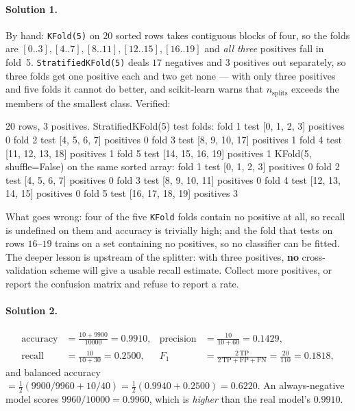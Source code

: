\documentclass[11pt]{article}
\begin{document}
\paragraph{Solution 1.} By hand: \texttt{KFold(5)} on $20$ sorted rows takes
contiguous blocks of four, so the folds are $[0..3], [4..7], [8..11],
[12..15], [16..19]$ and \emph{all three} positives fall in fold~5.
\texttt{StratifiedKFold(5)} deals $17$ negatives and $3$ positives out
separately, so three folds get one positive each and two get none --- with
only three positives and five folds it cannot do better, and scikit-learn
warns that $n_{\text{splits}}$ exceeds the members of the smallest class.
Verified:

\begin{codeout}
20 rows, 3 positives.  StratifiedKFold(5) test folds:
   fold 1  test [0, 1, 2, 3]  positives 0
   fold 2  test [4, 5, 6, 7]  positives 0
   fold 3  test [8, 9, 10, 17]  positives 1
   fold 4  test [11, 12, 13, 18]  positives 1
   fold 5  test [14, 15, 16, 19]  positives 1
KFold(5, shuffle=False) on the same sorted array:
   fold 1  test [0, 1, 2, 3]  positives 0
   fold 2  test [4, 5, 6, 7]  positives 0
   fold 3  test [8, 9, 10, 11]  positives 0
   fold 4  test [12, 13, 14, 15]  positives 0
   fold 5  test [16, 17, 18, 19]  positives 3
\end{codeout}

What goes wrong: four of the five \texttt{KFold} folds contain no positive at
all, so recall is undefined on them and accuracy is trivially high; and the
fold that tests on rows $16$--$19$ trains on a set containing no positives, so
no classifier can be fitted. The deeper lesson is upstream of the splitter:
with three positives, \textbf{no} cross-validation scheme will give a usable
recall estimate. Collect more positives, or report the confusion matrix and
refuse to report a rate.

\paragraph{Solution 2.}
\begin{align*}
  \text{accuracy} &= \frac{10 + 9900}{10000} = 0.9910, &
  \text{precision} &= \frac{10}{10 + 60} = 0.1429,\\
  \text{recall} &= \frac{10}{10 + 30} = 0.2500, &
  F_1 &= \frac{2\,\mathrm{TP}}{2\,\mathrm{TP} + \mathrm{FP} + \mathrm{FN}}
      = \frac{20}{110} = 0.1818,
\end{align*}
and balanced accuracy $= \tfrac12(9900/9960 + 10/40) = \tfrac12(0.9940 +
0.2500) = 0.6220$. An always-negative model scores $9960/10000 = 0.9960$,
which is \emph{higher} than the real model's $0.9910$.
\end{document}
